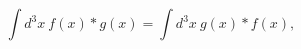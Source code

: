\begin{equation}
  \int d^3 x~ f(x) \ast g(x) = \int d^3 x~ g(x) \ast f(x),
\label{cyclic}
\end{equation}

